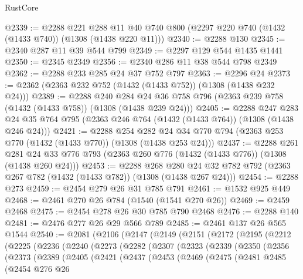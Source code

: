 \begin{lexlean}{RustCore}
\begin{coremodule}
@2339 := @2288
    @221
    @288
    @11
    @40
    @740
    @800
    (@2297 @220 @740 (@1432 (@1433 @740)) (@1308 (@1438 @220 @11)))
@2340 := @2288 @130
@2345 := @2340 @287 @11 @39 @544 @799
@2349 := @2297 @129 @544 @1435 @1441
@2350 := @2345 @2349
@2356 := @2340 @286 @11 @38 @544 @798 @2349
@2362 := @2288 @233 @285 @24 @37 @752 @797
@2363 := @2296 @24
@2373 := @2362 (@2363 @232 @752 (@1432 (@1433 @752)) (@1308 (@1438 @232 @24)))
@2389 := @2288
    @240
    @284
    @24
    @36
    @758
    @796
    (@2363 @239 @758 (@1432 (@1433 @758)) (@1308 (@1438 @239 @24)))
@2405 := @2288
    @247
    @283
    @24
    @35
    @764
    @795
    (@2363 @246 @764 (@1432 (@1433 @764)) (@1308 (@1438 @246 @24)))
@2421 := @2288
    @254
    @282
    @24
    @34
    @770
    @794
    (@2363 @253 @770 (@1432 (@1433 @770)) (@1308 (@1438 @253 @24)))
@2437 := @2288
    @261
    @281
    @24
    @33
    @776
    @793
    (@2363 @260 @776 (@1432 (@1433 @776)) (@1308 (@1438 @260 @24)))
@2453 := @2288
    @268
    @280
    @24
    @32
    @782
    @792
    (@2363 @267 @782 (@1432 (@1433 @782)) (@1308 (@1438 @267 @24)))
@2454 := @2288 @273
@2459 := @2454 @279 @26 @31 @785 @791
@2461 := @1532 @925 @449
@2468 := @2461 @270 @26 @784 (@1540 (@1541 @270 @26))
@2469 := @2459 @2468
@2475 := @2454 @278 @26 @30 @785 @790 @2468
@2476 := @2288 @140
@2481 := @2476 @277 @26 @29 @566 @789
@2485 := @2461 @137 @26 @565 @1544
@2540 := @2081
    (@2106
      (@2147
        (@2149
          (@2151
            (@2172
              (@2195
                (@2212
                  (@2225
                    (@2236
                      (@2240
                        (@2273
                          (@2282
                            (@2307
                              (@2323
                                (@2339
                                  (@2350
                                    (@2356
                                      (@2373
                                        (@2389
                                          (@2405
                                            (@2421
                                              (@2437
                                                (@2453
                                                  (@2469
                                                    (@2475
                                                      (@2481
                                                        @2485
                                                        (@2454
                                                          @276
                                                          @26

\end{coremodule}
\end{lexlean}
